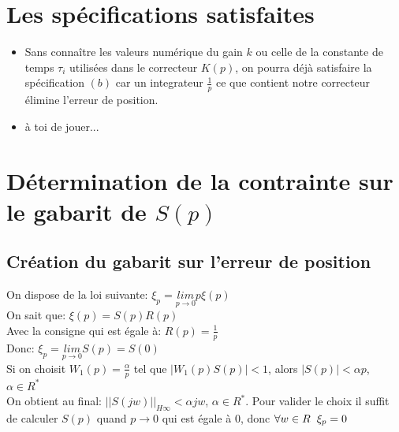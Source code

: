 \documentclass[12pt, a4paper, openany]{report}
\begin{document}
 \section{Les spécifications satisfaites}
 
  \begin{itemize} [label=,font=\small \color{black}]
  	\item Sans connaître les valeurs numérique du gain $k$ ou celle de la constante de temps $\tau_{i}$ utilisées dans le correcteur $K(p)$, on pourra déjà satisfaire la spécification $(b)$ car un integrateur $\frac{1}{p}$ ce que contient notre correcteur élimine l'erreur de position.
    \item à toi de jouer...
  \end{itemize}
 
 \section{Détermination de la contrainte sur le gabarit de $S(p)$}  
 
  \subsection{Création du gabarit sur l'erreur de position}
  
   On dispose de la loi suivante: \hspace{5mm} $\xi_{p}=\underset{p\longrightarrow 0}{lim}  p\xi(p)$\\[0.75cm]
   On sait que: \hspace{5mm} $\xi(p)=S(p)R(p)$\\[0.75cm]
   Avec la consigne qui est égale à: \hspace{5mm} $R(p)=\frac{1}{p}$\\[0.75cm]
   Donc: \hspace{5mm} $\xi_{p}=\underset{p\longrightarrow 0}{lim} S(p)=S(0)$\\[0.75cm]
   Si on choisit $W_{1}(p)=\frac{\alpha}{p}$ tel que $|W_{1}(p)S(p)|<1$, alors $|S(p)|<\alpha p$, $\alpha \in R^{*}$ \\[0.75cm]
   On obtient au final: \hspace{5mm} $||S(jw)||_{H\infty}<\alpha jw$, $\alpha \in R^{*}$. Pour valider le choix il suffit de calculer $S(p)$ quand $p\rightarrow0$ qui est égale à $0$, donc $\forall w \in R \hspace{2mm} \xi_{p}=0$ 
   
   \begin{center}
    \label{fig4}
  \end{center}
   
\end{document}
